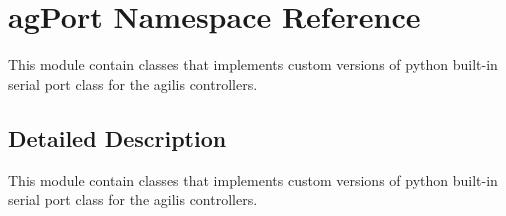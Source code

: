 \hypertarget{namespaceag_port}{}\section{ag\+Port Namespace Reference}
\label{namespaceag_port}


This module contain classes that implements custom versions of python built-\/in serial port class for the agilis controllers.  




\subsection{Detailed Description}
This module contain classes that implements custom versions of python built-\/in serial port class for the agilis controllers. 